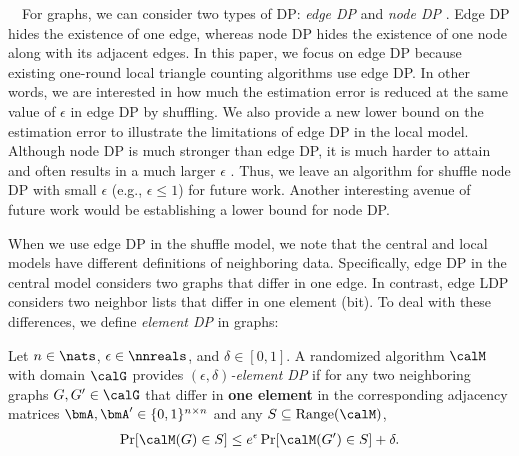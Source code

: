 \smallskip
{}~~For graphs, we can consider two types of DP: 
\textit{edge DP} and \textit{node DP} \cite{Hay_ICDM09,Raskhodnikova_Encyclopedia16}. 
Edge DP hides the existence of one edge, whereas node DP hides the existence of one node along with its adjacent edges. 
In this paper, we focus on edge DP because existing one-round local triangle counting algorithms \cite{Imola_USENIX21,Imola_USENIX22,Ye_ICDE20,Ye_TKDE21} use edge DP. 
In other words, we are interested in 
how much the estimation error is reduced at the same value of $\epsilon$ in edge DP by shuffling. 
We also provide a new lower bound on the estimation error to illustrate the limitations of edge DP in the local model. 
Although node DP is much stronger than edge DP, it is much harder to attain and often results in a much larger $\epsilon$ \cite{Chen_SIGMOD13,Sajadmanesh_arXiv22}. 
Thus, we leave an algorithm for shuffle node DP with small $\epsilon$ (e.g., $\epsilon \leq 1$) for future work. 
Another interesting avenue of future work would be establishing a lower bound for node DP. 

When we use edge DP in the shuffle model, we note that the central and local models have different definitions of neighboring data. 
Specifically, edge DP in the central model \cite{Raskhodnikova_Encyclopedia16} considers two graphs that differ in one edge. 
In contrast, edge LDP 
\cite{Qin_CCS17} considers two neighbor lists that differ in one element (bit). 
To deal with these differences, we define \textit{element DP} in graphs:

\begin{definition}  \label{chap3-def:element_DP} 
Let $n \in \nats$, $\epsilon \in \nnreals$, and $\delta \in [0,1]$. 
A randomized algorithm $\calM$ with domain $\calG$ provides \emph{$(\epsilon, \delta)$-element DP} 
if for any two neighboring graphs $G, G' \in \calG$ that differ in \textbf{one element} in the corresponding adjacency matrices $\bmA, \bmA' \in \{0,1\}^{n \times n}$
and any $S \subseteq \mathrm{Range}(\calM)$, 
\begin{align}
\Pr[\calM(G) \in S] \leq e^\epsilon \Pr[\calM(G') \in S] + \delta.
\label{chap3-eq:element_DP}
\end{align}
\end{definition}

